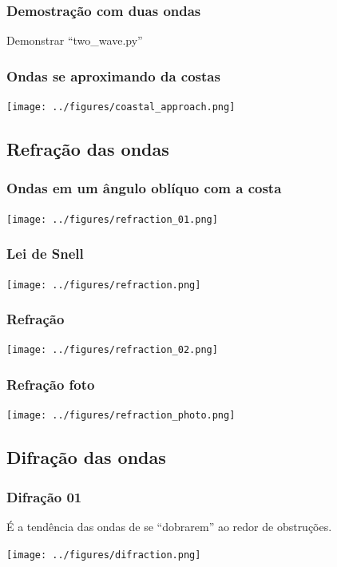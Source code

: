 \begin{frame}
  \frametitle{Demostração com duas ondas}
  \begin{block}{}
    Demonstrar ``two\_wave.py''
  \end{block}
\end{frame}

\begin{frame}
\frametitle{Ondas se aproximando da costas}
\begin{center}
  \texttt{[image: ../figures/coastal\_approach.png]}
\end{center}
\end{frame}


\subsection{Refração das ondas}
\begin{frame}
\frametitle{Ondas em um ângulo oblíquo com a costa}
  \begin{center}
    \texttt{[image: ../figures/refraction\_01.png]}
  \end{center}
\end{frame}

\begin{frame}
\frametitle{Lei de Snell}
  \begin{center}
    \texttt{[image: ../figures/refraction.png]}
  \end{center}
\end{frame}



\begin{frame}
\frametitle{Refração}
  \begin{center}
    \texttt{[image: ../figures/refraction\_02.png]}
  \end{center}
\end{frame}


\begin{frame}
\frametitle{Refração foto}
  \begin{center}
    \texttt{[image: ../figures/refraction\_photo.png]}
  \end{center}
\end{frame}


\subsection{Difração das ondas}
\begin{frame}
\frametitle{Difração 01}
  {\scriptsize É a tendência das ondas de se ``dobrarem'' ao redor de
               obstruções.}
  \begin{center}
    \texttt{[image: ../figures/difraction.png]}
  \end{center}
\end{frame}


